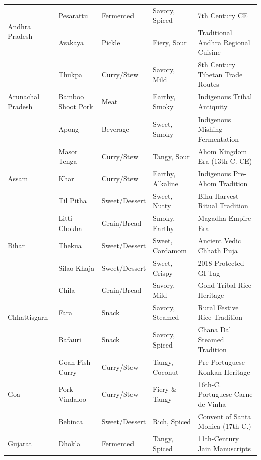 \documentclass[11pt,a4paper]{report}
\begin{document}
\begin{small}
\begin{longtable}{llllp{4.2cm}}
    \multirow{2}{*}{Andhra Pradesh} 
        & Pesarattu & Fermented & Savory, Spiced & 7th Century CE \\
        & Avakaya & Pickle & Fiery, Sour & Traditional Andhra Regional Cuisine \\
    \midrule
    \multirow{3}{*}{Arunachal Pradesh}
        & Thukpa & Curry/Stew & Savory, Mild & 8th Century Tibetan Trade Routes \\
        & Bamboo Shoot Pork & Meat & Earthy, Smoky & Indigenous Tribal Antiquity \\
        & Apong & Beverage & Sweet, Smoky & Indigenous Mishing Fermentation \\
    \midrule
    \multirow{3}{*}{Assam}
        & Masor Tenga & Curry/Stew & Tangy, Sour & Ahom Kingdom Era (13th C. CE) \\
        & Khar & Curry/Stew & Earthy, Alkaline & Indigenous Pre-Ahom Tradition \\
        & Til Pitha & Sweet/Dessert & Sweet, Nutty & Bihu Harvest Ritual Tradition \\
    \midrule
    \multirow{3}{*}{Bihar}
        & Litti Chokha & Grain/Bread & Smoky, Earthy & Magadha Empire Era \\
        & Thekua & Sweet/Dessert & Sweet, Cardamom & Ancient Vedic Chhath Puja \\
        & Silao Khaja & Sweet/Dessert & Sweet, Crispy & 2018 Protected GI Tag \\
    \midrule
    \multirow{3}{*}{Chhattisgarh}
        & Chila & Grain/Bread & Savory, Mild & Gond Tribal Rice Heritage \\
        & Fara & Snack & Savory, Steamed & Rural Festive Rice Tradition \\
        & Bafauri & Snack & Savory, Spiced & Chana Dal Steamed Tradition \\
    \midrule
    \multirow{3}{*}{Goa}
        & Goan Fish Curry & Curry/Stew & Tangy, Coconut & Pre-Portuguese Konkan Heritage \\
        & Pork Vindaloo & Curry/Stew & Fiery \& Tangy & 16th-C. Portuguese Carne de Vinha \\
        & Bebinca & Sweet/Dessert & Rich, Spiced & Convent of Santa Monica (17th C.) \\
    \midrule
    \multirow{3}{*}{Gujarat}
        & Dhokla & Fermented & Tangy, Spiced & 11th-Century Jain Manuscripts \\

\end{longtable}
\end{small}
\end{document}
